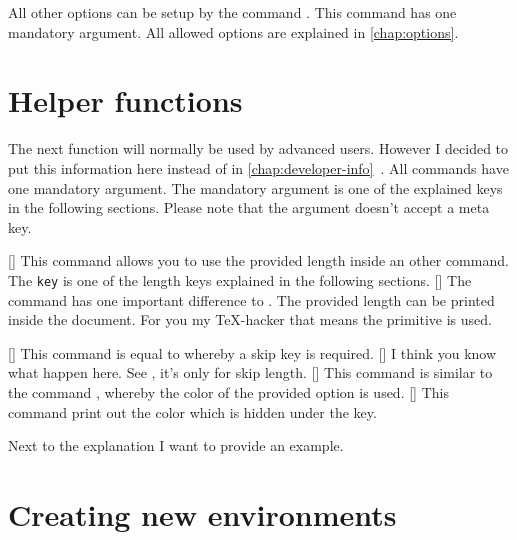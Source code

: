 \documentclass[openany,12pt,tocdepth=3]{ltx-md}
\begin{document}
All other options can be setup by the command .
This command has one mandatory argument. All allowed options are explained
in \autoref{chap:options}. 

\section{Helper functions}\label{sec:helperfunctions}
The next function will normally be used by advanced users. However
I decided to put this information here instead of in
\autoref{chap:developer-info}~.
All commands have one mandatory argument. The mandatory argument
is one of the explained keys in the following sections. Please note 
that the argument doesn't accept a meta key.

[\MArgs[key]]
This command  allows you to use the
provided length inside an other command. The \texttt{key} is one of
the length keys explained in the following sections. 
[\MArgs[key]]
The command  has one important
difference to . The provided length
can be printed inside the document. For you my \TeX-hacker
that means the primitive  is used. 

[\MArgs[key]]
This command is equal to  whereby
a skip key is required.
[\MArgs[key]]
I think you know what happen here. See , 
it's only for skip length.
[\MArgs[key]]
This command is similar to the command , whereby the
color of the provided option is used.
[\MArgs[key]]
This command print out the color which is hidden under the key.

Next to the explanation I want to provide an example. 

\begin{ltxexample}[caption=Example of helper functions,label=helper,result=false,]
 \begin{xframed}
 \end{xframed}
\end{ltxexample}


\section{Creating new environments}\label{sec:newenv}
\end{document}

